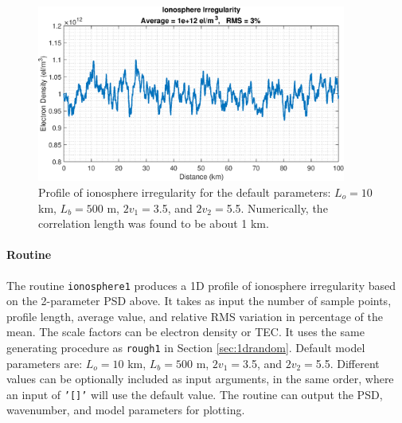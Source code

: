 \begin{figure}[H] 
   \centering
 \includegraphics[width=4in]{RandomObjects/Figures/ionoProfile} 
   \caption{Profile of ionosphere irregularity for the default parameters: $L_o = 10$ km, $L_b = 500$ m, $2v_1=$3.5, and $2v_2=$5.5. Numerically, the correlation length was found to be about 1 km. }
\end{figure}

\paragraph{Routine} The routine \texttt{ionosphere1} produces a 1D profile of ionosphere irregularity based on the 2-parameter PSD above. It takes as input the number of sample points, profile length, average value, and relative RMS variation in percentage of the mean. The scale factors can be electron density or TEC. It uses the same generating procedure as \texttt{rough1} in Section \ref{sec:1drandom}. Default model parameters are: $L_o = 10$ km, $L_b = 500$ m, $2v_1=$3.5, and $2v_2=$5.5. Different values can be optionally included as input arguments, in the same order, where an input of \texttt{'[]'} will use the default value. The routine can output the PSD, wavenumber, and model parameters for plotting.


{\footnotesize
{}
}


